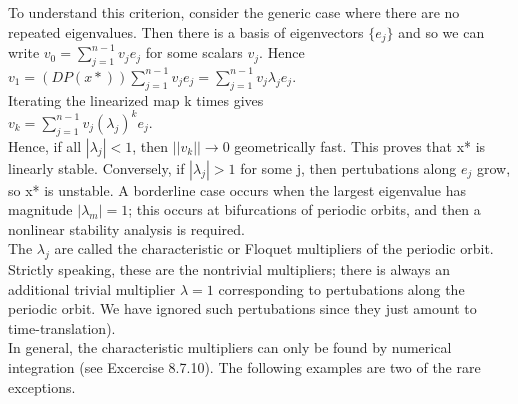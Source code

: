\documentclass{article}
\newcommand\tab[1][1cm]{\hspace*{#1}}
\begin{document}
To understand this criterion, consider the generic case where there are no repeated eigenvalues. Then there is a basis of eigenvectors $\{e_{j}\}$ and so we can write $v_{0}=\sum_{j=1}^{n-1} v_{j}e_{j}$ for some scalars $v_{j}$. Hence \\ \tab \tab
$v_{1}=(DP(x*))\sum_{j=1}^{n-1}v_{j}e_{j}=\sum_{j=1}^{n-1}v_{j}\lambda_{j}e_{j}$. \\ 
Iterating the linearized map k times gives \\ \tab \tab
$v_{k}=\sum_{j=1}^{n-1}v_{j}(\lambda_{j})^{k}e_{j}$. \\ 
Hence, if all $|\lambda_{j}|<1$, then $||v_{k}|| \to 0$ geometrically fast. This proves that x* is linearly stable. Conversely, if $|\lambda_{j}| > 1$ for some j, then pertubations along $e_{j}$ grow, so x* is unstable. A borderline case occurs when the largest eigenvalue has magnitude $|\lambda_{m}|=1$; this occurs at bifurcations of periodic orbits, and then a nonlinear stability analysis is required. \\ \tab
The $\lambda_{j}$ are called the characteristic or Floquet multipliers of the periodic orbit. Strictly speaking, these are the nontrivial multipliers; there is always an additional trivial multiplier $\lambda = 1$ corresponding to pertubations along the periodic orbit. We have ignored such pertubations since they just amount to time-translation). \\
\tab In general, the characteristic multipliers can only be found by numerical integration (see Excercise 8.7.10). The following examples are two of the rare exceptions.
\end{document}
